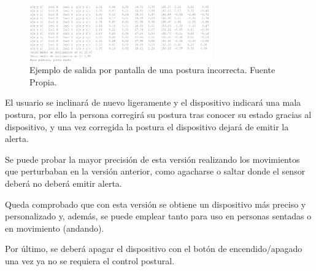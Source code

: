 \begin{figure}[h!]
    \centering
    \includegraphics[width=0.7\textwidth]{img/PantallaPosturaInc.png}
    \caption{Ejemplo de salida por pantalla de una postura incorrecta. Fuente Propia.}
    \label{fig:imgV2_posturaInc_Pantalla} 
\end{figure}

El usuario se inclinará de nuevo ligeramente y el dispositivo indicará una mala postura, por ello la persona corregirá su postura tras conocer su estado gracias al dispositivo, y una vez corregida la postura el dispositivo dejará de emitir la alerta.

Se puede probar la mayor precisión de esta versión realizando los movimientos que perturbaban en la versión anterior, como agacharse o saltar donde el sensor deberá no deberá emitir alerta.

Queda comprobado que con esta versión se obtiene un dispositivo más preciso y personalizado y, además, se puede emplear tanto para uso en personas sentadas o en movimiento (andando).

Por último, se deberá apagar el dispositivo con el botón de encendido/apagado una vez ya no se requiera el control postural.

